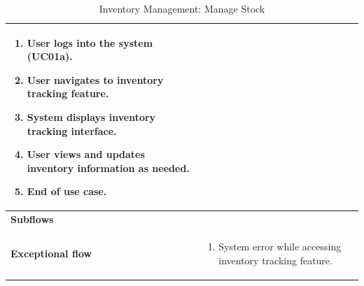 \documentclass[../thesis.tex]{subfiles}
\begin{document}
\begin{center}
\begin{table}[H]
{\begin{tabular}[htbp]{|p{}|p{}|}
\begin{enumerate}
                                                       \item User logs into the system (UC01a).
                                                       \item  User navigates to inventory tracking feature.
                                                       \item System displays inventory tracking interface.
                                                       \item  User views and updates inventory information as needed.
                                                       \item End of use case.
                                                   \end{enumerate}       \\ \hline
                \textbf{Subflows              }  &                                                                     \\ \hline
                \textbf{Exceptional flow       } & \begin{enumerate}
                                                       \item System error while accessing inventory tracking feature.
                                                   \end{enumerate}       \\ \hline
            \end{tabular}%
        }
        \caption{Inventory Management: Manage Stock}
        \label{tab:table-usecase-inventory-tracking}


    \end{table}
\end{center}
\end{document}
